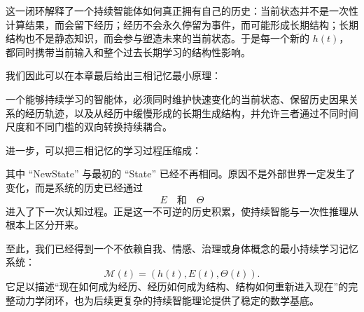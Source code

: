 这一闭环解释了一个持续智能体如何真正拥有自己的历史：当前状态并不是一次性计算结果，而会留下经历；经历不会永久停留为事件，而可能形成长期结构；长期结构也不是静态知识，而会参与塑造未来的当前状态。于是每一个新的 $h(t)$，都同时携带当前输入和整个过去长期学习的结构性影响。

我们因此可以在本章最后给出三相记忆最小原理：

\begin{statementbox}
一个能够持续学习的智能体，必须同时维护快速变化的当前状态、保留历史因果关系的经历轨迹，以及从经历中缓慢形成的长期生成结构，并允许三者通过不同时间尺度和不同门槛的双向转换持续耦合。
\end{statementbox}

进一步，可以把三相记忆的学习过程压缩成：
\begin{statementbox}
\centering
{}
\end{statementbox}

其中 ``NewState'' 与最初的 ``State'' 已经不再相同。原因不是外部世界一定发生了变化，而是系统的历史已经通过
\[
E
\quad\text{和}\quad
\Theta
\]
进入了下一次认知过程。正是这一不可逆的历史积累，使持续智能与一次性推理从根本上区分开来。

至此，我们已经得到一个不依赖自我、情感、治理或身体概念的最小持续学习记忆系统：
\[
\boxed{
\mathcal M(t)
=
(h(t),E(t),\Theta(t)).
}
\]
它足以描述“现在如何成为经历、经历如何成为结构、结构如何重新进入现在”的完整动力学闭环，也为后续更复杂的持续智能理论提供了稳定的数学基底。
